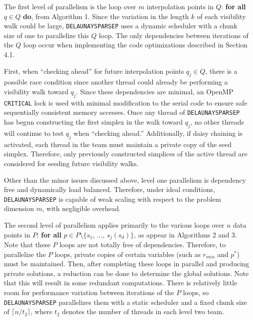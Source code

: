 
The first level of parallelism is the loop over $m$ interpolation points
in $Q$: {\bf for all} $q \in Q$ {\bf do}, from Algorithm 1. Since
the variation in the length $k$ of each visibility walk could be large,
{\tt DELAUNAYSPARSEP} uses a dynamic scheduler with a chunk size of one
to parallelize this $Q$ loop. The only dependencies between iterations of
the $Q$ loop occur when implementing the code optimizations described in
Section 4.1.

First, when ``checking ahead'' for future interpolation points
$q_j\in Q$, there is a possible race condition since another thread
could already be performing a visibility walk toward $q_j$. Since these
dependencies are minimal, an OpenMP {\tt CRITICAL} lock is used with
minimal modification to the serial code to ensure safe sequentially
consistent memory accesses. Once any thread of {\tt DELAUNAYSPARSEP} has
begun constructing the first simplex in the walk toward $q_j$, no other
threads will continue to test $q_j$ when ``checking ahead.''
Additionally, if daisy chaining is activated, each thread in the team
must maintain a private copy of the seed simplex. Therefore, only
previously constructed simplices of the active thread are considered
for seeding future visibility walks.

Other than the minor issues discussed above, level one
parallelism is dependency free and dynamically load balanced.
Therefore, under ideal conditions, {\tt DELAUNAYSPARSEP} is capable of
weak scaling with respect to the problem dimension $m$, with negligible
overhead.


The second level of parallelism applies primarily to the various loops
over $n$ data points in $P$: {\bf for all} $p\in P \setminus \{s_1$,
$\ldots$, $s_j(s_d)\}$, as appear in Algorithms 2 and 3. Note that
these $P$ loops are not totally free of dependencies. Therefore, to
parallelize the $P$ loops, private copies of certain variables (such as
$r_{min}$ and $p^*$) must be maintained. Then, after completing these loops
in parallel and producing private solutions, a reduction can be done to
determine the global solutions. Note that this will result in some
redundant computations. There is relatively little room for performance
variation between iterations of the $P$ loops, so {\tt DELAUNAYSPARSEP}
parallelizes them with a static scheduler and a fixed chunk size of
$\lceil n/t_2 \rceil$, where $t_2$ denotes the number of threads in
each level two team.

